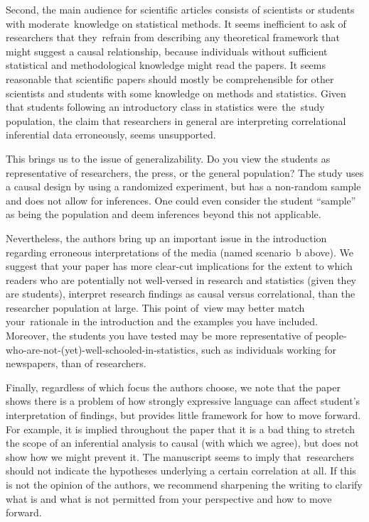 \documentclass[10pt]{article}
\begin{document}
Second, the main audience for scientific articles consists of scientists
or students with moderate~knowledge on statistical methods. It seems
inefficient to ask of researchers that they~refrain from describing any
theoretical framework that might suggest a causal relationship, because
individuals without sufficient statistical and methodological knowledge
might read the papers. It seems reasonable that scientific papers should
mostly be comprehensible for other scientists and students with some
knowledge on methods and statistics. Given that students following an
introductory class in statistics were~the~study population, the claim
that researchers in general are interpreting correlational inferential
data erroneously, seems unsupported.~

This brings us to the issue of generalizability. Do you view the
students as representative of researchers, the press, or the general
population? The study uses a causal design by using a randomized
experiment, but has a non-random sample and does not allow for
inferences. One could even consider the student ``sample'' as being the
population and deem inferences beyond this not applicable.

Nevertheless, the authors bring up an important issue in the
introduction regarding erroneous interpretations of the media (named
scenario~b above). We suggest that your paper has more clear-cut
implications for the extent to which readers who are potentially not
well-versed in research and statistics (given they are students),
interpret research findings as causal versus correlational, than the
researcher population at large. This point of~view may better match
your~rationale in the introduction and the examples you have included.
Moreover, the students you have tested may be more representative of
people-who-are-not-(yet)-well-schooled-in-statistics, such as
individuals working for newspapers, than of researchers.~

Finally, regardless of which focus the authors choose, we note that the
paper shows there is a problem of how strongly expressive language can
affect student's interpretation of findings, but provides little
framework for how to move forward. For example, it is implied throughout
the paper that it is a bad thing to stretch the scope of an inferential
analysis to causal (with which we agree), but does not show how we might
prevent it. The manuscript seems to imply that~researchers should not
indicate the hypotheses underlying a certain correlation at all. If this
is not the opinion of the authors, we recommend sharpening the writing
to clarify what is and what is not permitted from your perspective and
how to move forward.
\end{document}
